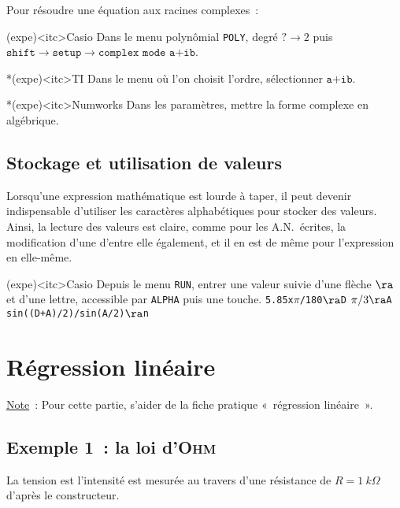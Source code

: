 \documentclass[../main/main.tex]{subfiles}
\begin{document}
Pour résoudre une équation aux racines complexes~:

\begin{tcbraster}[raster columns=3, raster equal height=rows]
	\begin{tcb}(expe)<itc>{Casio}
		Dans le menu polynômial \texttt{POLY}, degré $? \rightarrow
			2$ puis $\texttt{shift} \rightarrow \texttt{setup} \rightarrow
			\texttt{complex mode a+ib}$.
	\end{tcb}
	\begin{tcb}*(expe)<itc>{TI}
		Dans le menu où l'on choisit l'ordre, sélectionner $\texttt{a+ib}$.
	\end{tcb}
	\begin{tcb}*(expe)<itc>{Numworks}
		Dans les paramètres, mettre la forme complexe en algébrique.
	\end{tcb}
\end{tcbraster}

\subsection{Stockage et utilisation de valeurs}
Lorsqu'une expression mathématique est lourde à taper, il peut devenir
indispensable d'utiliser les caractères alphabétiques pour stocker des valeurs.
Ainsi, la lecture des valeurs est claire, comme pour les A.N.\ écrites, la
modification d'une d'entre elle également, et il en est de même pour
l'expression en elle-même.

\begin{tcb}[sidebyside](expe)<itc>{Casio}
	Depuis le menu \texttt{RUN}, entrer une valeur suivie d'une flèche $\ra$ et
	d'une lettre, accessible par \texttt{ALPHA} puis une touche.
	\tcblower
	\texttt{\num{5.85}x$\pi$/180$\ra$D}
	\smallbreak
	\texttt{$\pi/3\ra$A}
	\smallbreak
	\texttt{sin((D+A)/2)/sin(A/2)$\ra$n}
\end{tcb}

\section{Régression linéaire}

\underline{Note}~: Pour cette partie, s'aider de la fiche pratique «~régression
linéaire~».

\subsection{Exemple 1~: la loi d'\textsc{Ohm}}

La tension est l'intensité est mesurée au travers d'une résistance de $R=
	\SI{1}{k\Omega}$ d'après le constructeur.
\end{document}

